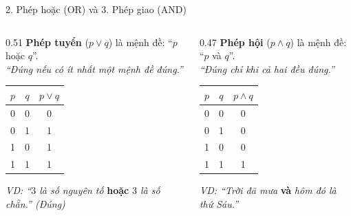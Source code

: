 \documentclass[aspectratio=169, 11pt]{beamer}
\begin{document}
\begin{frame}{2. Phép hoặc (OR) và 3. Phép giao (AND)}
\begin{columns}[t, onlytextwidth]
  \begin{column}{0.51\textwidth}
    \textbf{Phép tuyển} ($p \lor q$) là mệnh đề: ``$p$ hoặc $q$''.\\
    \textit{``Đúng nếu có ít nhất một mệnh đề đúng.''}

    \vspace{0.3cm}
    \centering
    \begin{tabular}{|c|c|c|}
    \hline
    $p$ & $q$ & $p \lor q$ \\
    \hline
    0 & 0 & 0 \\
    0 & 1 & 1 \\
    1 & 0 & 1 \\
    1 & 1 & 1 \\
    \hline
    \end{tabular}

    \vspace{0.3cm}
    \raggedright
    \textit{VD: ``$3$ là số nguyên tố} \textbf{hoặc} \textit{$3$ là số chẵn.'' (Đúng)}
  \end{column}
  \begin{column}{0.47\textwidth}
    \textbf{Phép hội} ($p \land q$) là mệnh đề: ``$p$ và $q$''.\\
    \textit{``Đúng chỉ khi cả hai đều đúng.''}

    \vspace{0.3cm}
    \centering
    \begin{tabular}{|c|c|c|}
    \hline
    $p$ & $q$ & $p \land q$ \\
    \hline
    0 & 0 & 0 \\
    0 & 1 & 0 \\
    1 & 0 & 0 \\
    1 & 1 & 1 \\
    \hline
    \end{tabular}

    \vspace{0.3cm}
    \raggedright
    \textit{VD: ``Trời đã mưa} \textbf{và} \textit{hôm đó là thứ Sáu.''}
  \end{column}
\end{columns}
\end{frame}
\end{document}

